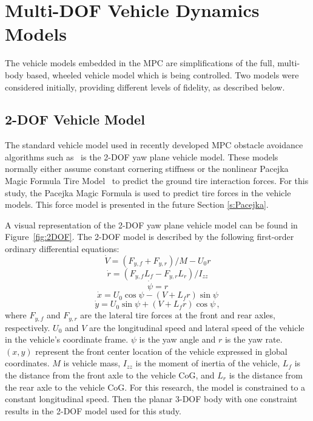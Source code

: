 \documentclass[12pt,onecolumn]{report}
\newcommand{\CHRONO}{{\sffamily{{Chrono}}}}
\begin{document}

\section{Multi-DOF Vehicle Dynamics Models}\label{s:IntModel}

The vehicle models embedded in the MPC are simplifications of the full, multi-body based, {\CHRONO} wheeled vehicle model which is being controlled.  Two models were considered initially, providing different levels of fidelity, as described below.


\subsection{2-DOF Vehicle Model}\label{ss:2DOFModel}
The standard vehicle model used in recently developed MPC obstacle avoidance algorithms such as~\cite{ModelFidelity2016} is the 2-DOF yaw plane vehicle model. These models normally either assume constant cornering stiffness or the nonlinear Pacejka Magic Formula Tire Model~\cite{Pacejka2012} to predict the ground tire interaction forces. For this study, the Pacejka Magic Formula is used to predict tire forces in the vehicle models. This force model is presented in the future Section \ref{s:Pacejka}.   

A visual representation of the 2-DOF yaw plane vehicle model can be found in Figure~\ref{fig:2DOF}. The 2-DOF model is described by the following first-order ordinary differential equations:
%
\begin{equation}\label{e:2DOF_Vdot}
\dot{V} = \left(F_{y,f} + F_{y,r}\right)/{M - U_0r} 
\end{equation}
\begin{equation}\label{e:2DOF_rdot}
\dot{r} = \left(F_{y,f}L_f - F_{y,r}L_r\right)/I_{zz}
\end{equation}
\begin{equation}\label{e:2DOF_psidot}
\dot{\psi} = r 
\end{equation}
\begin{equation}\label{e:2DOF_xdot}
\dot{x} = U_0\cos{\psi}-\left(V+L_fr\right)\sin{\psi}
\end{equation}
\begin{equation}\label{e:2DOF_ydot}
\dot{y} = U_0\sin{\psi}+\left(V+L_fr\right)\cos{\psi} \,,
\end{equation}
%
where $F_{y,f}$ and $F_{y,r}$ are the lateral tire forces at the front and rear axles, respectively. $U_0$ and $V$ are the longitudinal speed and lateral speed of the vehicle in the vehicle's coordinate frame. $\psi$ is the yaw angle and $r$ is the yaw rate. $\left(x,y\right)$ represent the front center location of the vehicle expressed in global coordinates. $M$ is vehicle mass, $I_{zz}$ is the moment of inertia of the vehicle, $L_f$ is the distance from the front axle to the vehicle CoG, and $L_r$ is the distance from the rear axle to the vehicle CoG. For this research, the model is constrained to a constant longitudinal speed. Then the planar 3-DOF body with one constraint results in the 2-DOF model used for this study.
\end{document}
